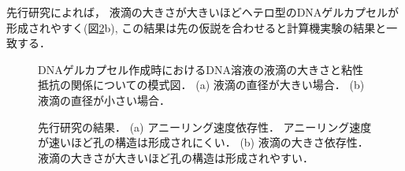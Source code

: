 先行研究によれば，
液滴の大きさが大きいほどヘテロ型のDNAゲルカプセルが形成されやすく(図\ref{fig:result_moritasan}b), 
この結果は先の仮説を合わせると計算機実験の結果と一致する．

\begin{figure}
\centering

\caption{
    DNAゲルカプセル作成時におけるDNA溶液の液滴の大きさと粘性抵抗の関係についての模式図．
    (a) 液滴の直径が大きい場合．
    (b) 液滴の直径が小さい場合．
}
\label{fig:size_and_friction}
\end{figure}

\begin{figure}
\centering

\caption{
    先行研究の結果\cite{moritasan}．
    (a) アニーリング速度依存性．
        アニーリング速度が速いほど孔の構造は形成されにくい．
    (b) 液滴の大きさ依存性．
        液滴の大きさが大きいほど孔の構造は形成されやすい．
}
\label{fig:result_moritasan}
\end{figure}
